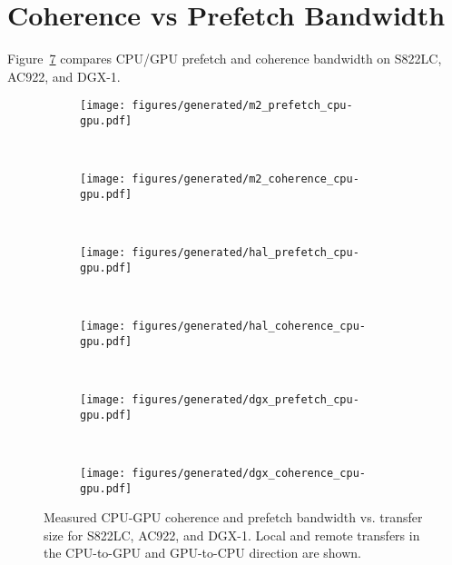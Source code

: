 %
%
%
\section{Coherence vs Prefetch Bandwidth}
\label{sec:um-coherence-prefetch}

Figure~\ref{fig:um-cpu-gpu} compares CPU/GPU prefetch and coherence bandwidth on S822LC, AC922, and DGX-1.

\begin{figure}[H]
	\centering
	\begin{subfigure}[b]{0.45\textwidth}
		\texttt{[image: figures/generated/m2\_prefetch\_cpu-gpu.pdf]}
		\caption{}
		\label{fig:um-prefetch-s822lc-cpu-gpu}
	\end{subfigure}
	~
	\begin{subfigure}[b]{0.45\textwidth}
		\texttt{[image: figures/generated/m2\_coherence\_cpu-gpu.pdf]}
		\caption{}
		\label{fig:um-coherence-s822lc-cpu-gpu}
	\end{subfigure}
	\\
	\begin{subfigure}[b]{0.45\textwidth}
		\texttt{[image: figures/generated/hal\_prefetch\_cpu-gpu.pdf]}
		\caption{}
		\label{fig:um-prefetch-ac922-cpu-gpu}
	\end{subfigure}
	~
	\begin{subfigure}[b]{0.45\textwidth}
		\texttt{[image: figures/generated/hal\_coherence\_cpu-gpu.pdf]}
		\caption{}
		\label{fig:um-coherence-ac922-cpu-gpu}
	\end{subfigure}
	\\
	\begin{subfigure}[b]{0.45\textwidth}
		\texttt{[image: figures/generated/dgx\_prefetch\_cpu-gpu.pdf]}
		\caption{}
		\label{fig:um-prefetch-dgx-cpu-gpu}
	\end{subfigure}
	~
	\begin{subfigure}[b]{0.45\textwidth}
		\texttt{[image: figures/generated/dgx\_coherence\_cpu-gpu.pdf]}
		\caption{}
		\label{fig:um-coherence-dgx-cpu-gpu}
	\end{subfigure}
	\caption[CPU/GPU Coherence and Prefetch Bandwidth]{
		Measured CPU-GPU coherence and prefetch bandwidth vs. transfer size  for S822LC, AC922, and DGX-1.
		Local and remote transfers in the CPU-to-GPU and GPU-to-CPU direction are shown.
	}
	\label{fig:um-cpu-gpu}
\end{figure}


